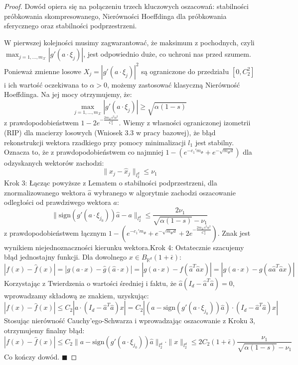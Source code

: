 \begin{proof}
Dowód opiera się na połączeniu trzech kluczowych oszacowań: stabilności próbkowania skompresowanego, Nierówności Hoeffdinga dla próbkowania sferycznego oraz stabilności podprzestrzeni.
    
W pierwszej kolejności musimy zagwarantować, że maksimum z pochodnych, czyli $\max_{j=1,\dots,m_\mathcal{X}} |g'(a \cdot \xi_j)|$, jest odpowiednio duże, co uchroni nas przed szumem. Ponieważ zmienne losowe $X_j = |g'(a \cdot \xi_j)|^2$ są ograniczone do przedziału $[0, C_2^2]$ i ich wartość oczekiwana to $\alpha > 0$, możemy zastosować klasyczną Nierówność Hoeffdinga. Na jej mocy otrzymujemy, że:
$$\max_{j=1,\dots,m_\mathcal{X}} |g'(a \cdot \xi_j)| \ge \sqrt{\alpha(1-s)}$$z prawdopodobieństwem $1 - 2e^{-\frac{2m_\mathcal{X} s^2 \alpha^2}{C_2^4}}$.
Wiemy z własności ograniczonej izometrii (RIP) dla macierzy losowych (Wniosek 3.3 w pracy bazowej), że błąd rekonstrukcji wektora rzadkiego przy pomocy minimalizacji $l_1$ jest stabilny. Oznacza to, że z prawdopodobieństwem co najmniej $1 - (e^{-c_1' m_\Phi} + e^{-\sqrt{m_\Phi d}})$ dla odzyskanych wektorów zachodzi:
$$\|x_j - \hat{x}_j\|_{l_2^d} \le \nu_1$$Krok 3: Łącząc powyższe z Lematem o stabilności podprzestrzeni, dla znormalizowanego wektora $\hat{a}$ wybranego w algorytmie zachodzi oszacowanie odległości od prawdziwego wektora $a$:
$$\|\text{sign}(g'(a \cdot \xi_{j_0}))\hat{a} - a\|_{l_2^d} \le \frac{2\nu_1}{\sqrt{\alpha(1-s)} - \nu_1}$$z prawdopodobieństwem łącznym $1 - (e^{-c_1' m_\Phi} + e^{-\sqrt{m_\Phi d}} + 2e^{-\frac{2m_\mathcal{X} s^2 \alpha^2}{C_2^4}})$. Znak jest wynikiem niejednoznaczności kierunku wektora.Krok 4: Ostatecznie szacujemy błąd jednostajny funkcji. Dla dowolnego $x \in B_{\mathbb{R}^d}(1+\bar{\epsilon})$:
$$|f(x) - \hat{f}(x)| = |g(a \cdot x) - \hat{g}(\hat{a} \cdot x)| = |g(a \cdot x) - f(\hat{a}^T \hat{a} x)| = |g(a \cdot x) - g(a \hat{a}^T \hat{a} x)|$$Korzystając z Twierdzenia o wartości średniej i faktu, że $\hat{a}(I_d - \hat{a}^T \hat{a}) = 0$, wprowadzamy składową ze znakiem, uzyskując:
$$|f(x) - \hat{f}(x)| \le C_2 |a \cdot (I_d - \hat{a}^T \hat{a})x| = C_2 |(a - \text{sign}(g'(a \cdot \xi_{j_0}))\hat{a}) \cdot (I_d - \hat{a}^T \hat{a})x|$$Stosując nierówność Cauchy'ego-Schwarza i wprowadzając oszacowanie z Kroku 3, otrzymujemy finalny błąd:
$$|f(x) - \hat{f}(x)| \le C_2 \|a - \text{sign}(g'(a \cdot \xi_{j_0}))\hat{a}\|_{l_2^d} \cdot \|x\|_{l_2^d} \le 2C_2(1+\bar{\epsilon})\frac{\nu_1}{\sqrt{\alpha(1-s)} - \nu_1}$$Co kończy dowód. $\blacksquare$
\end{proof}
